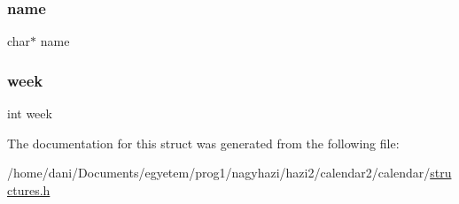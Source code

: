 \mbox{\label{struct_search_conditions_a5ac083a645d964373f022d03df4849c8}} 
\subsubsection{\texorpdfstring{name}{name}}
{\footnotesize\ttfamily char$\ast$ name}

\mbox{\label{struct_search_conditions_a3560bdec25d509ef8f4f02409eaa9f1d}} 
\subsubsection{\texorpdfstring{week}{week}}
{\footnotesize\ttfamily int week}



The documentation for this struct was generated from the following file\+:\begin{DoxyCompactItemize}
\item 
/home/dani/\+Documents/egyetem/prog1/nagyhazi/hazi2/calendar2/calendar/\hyperlink{structures_8h}{structures.\+h}\end{DoxyCompactItemize}
